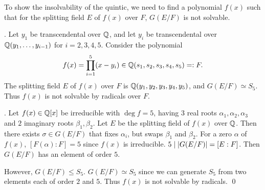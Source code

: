 To show the insolvability of the quintic, we need to find a polynomial \(f(x)\) such that for the splitting field \(E\) of \(f(x)\) over \(F\), \(G(E/F)\) is not solvable.

\thm. Let \(y_1\) be transcendental over \(\mathbb{Q}\), and let \(y_i\) be transcendental over \(\mathbb{Q}(y_1, \dots, y_{i-1})\) for \(i = 2, 3, 4, 5\). Consider the polynomial
\[
    f(x) = \prod_{i=1}^5 (x - y_i) \in \mathbb{Q}(s_1, s_2, s_3, s_4, s_5) =: F.
\]
The splitting field \(E\) of \(f(x)\) over \(F\) is \(\mathbb{Q}(y_1, y_2, y_3, y_4, y_5)\), and \(G(E/F) \simeq S_5\). Thus \(f(x)\) is not solvable by radicals over \(F\).

\ex. Let \(f(x) \in \mathbb{Q}[x]\) be irreducible with \(\deg f = 5\), having \(3\) real roots \(\alpha_1, \alpha_2, \alpha_3\) and \(2\) imaginary roots \(\beta_1, \beta_2\). Let \(E\) be the splitting field of \(f(x)\) over \(\mathbb{Q}\). Then there exists \(\sigma \in G(E/F)\) that fixes \(\alpha_i\), but swaps \(\beta_1\) and \(\beta_2\). For a zero \(\alpha\) of \(f(x)\), \([F(\alpha) : F] = 5\) since \(f(x)\) is irreducible. \(5 \mid \left| G(E/F) \right| = [E : F]\). Then \(G(E/F)\) has an element of order \(5\).

However, \(G(E/F) \leq S_5\). \(G(E/F) \simeq S_5\) since we can generate \(S_5\) from two elements each of order \(2\) and \(5\). Thus \(f(x)\) is not solvable by radicals. \qed
